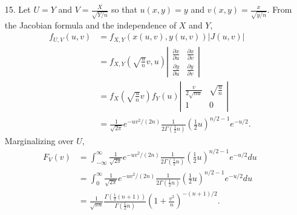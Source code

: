 \documentclass[a4paper,12pt]{article}
\begin{document}
\begin{enumerate}
    \item[15.] 
        Let $U = Y$ and $V = \frac{X}{\sqrt{Y / n}}$ so that $u(x, y) = y$ and $v(x, y) = \frac{x}{\sqrt{y / n}}$. From the Jacobian formula and the independence of $X$ and $Y$,
        \begin{align*}
            f_{U, V}(u, v) &= f_{X, Y}(x(u, v), y(u, v)) |J(u, v)| \\
            &= f_{X, Y}\left( \sqrt{ \frac{u}{n} } v, u \right)
            \left| \begin{array}{cc}
                \frac{\partial x}{\partial u} & \frac{\partial x}{\partial v} \\
                \frac{\partial y}{\partial u} & \frac{\partial y}{\partial v}
            \end{array} \right| \\
            &= f_X\left( \sqrt{ \frac{u}{n} } v \right) f_Y(u)
            \left| \begin{array}{cc}
                \frac{v}{2\sqrt{nu}} & \sqrt{\frac{u}{n}} \\
                1 & 0
            \end{array} \right| \\
            &= \frac{1}{\sqrt{2 \pi}} e^{-uv^2/(2n)} \frac{1}{2\Gamma(\frac{1}{2} n)} \left( \frac{1}{2} u \right)^{n/2 - 1} e^{-u/2}.
        \end{align*}
        Marginalizing over $U$,
        \begin{align*}
            F_{V}(v) &= \int_{-\infty}^\infty \frac{1}{\sqrt{2 \pi}} e^{-uv^2/(2n)} \frac{1}{2\Gamma(\frac{1}{2} n)} \left( \frac{1}{2} u \right)^{n/2 - 1} e^{-u/2} du \\
            &= \int_0^\infty \frac{1}{\sqrt{2 \pi}} e^{-uv^2/(2n)} \frac{1}{2\Gamma(\frac{1}{2} n)} \left( \frac{1}{2} u \right)^{n/2 - 1} e^{-u/2} du \\
            &= \frac{1}{\sqrt{\pi n}} \frac{\Gamma(\frac{1}{2}(n + 1))}{\Gamma(\frac{1}{2}n)} \left( 1 + \frac{v^2}{n} \right)^{-(n + 1) / 2}.
        \end{align*}


\end{enumerate}
\end{document}
